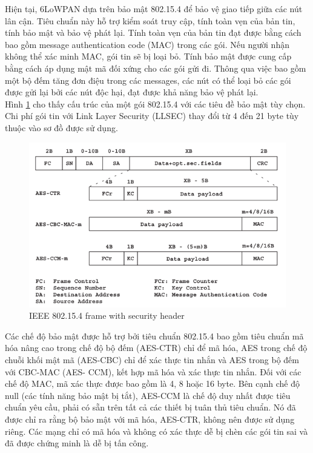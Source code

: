 \documentclass{report}
\begin{document}
Hiện tại, 6LoWPAN dựa trên bảo mật 802.15.4 để bảo vệ giao tiếp giữa các nút lân cận. Tiêu chuẩn này hỗ trợ kiểm soát truy cập, tính toàn vẹn của bản tin, tính bảo mật và bảo vệ phát lại. Tính toàn vẹn của bản tin đạt được bằng cách bao gồm message authentication code (MAC) trong các gói. Nếu người nhận không thể xác minh MAC, gói tin sẽ bị loại bỏ. Tính bảo mật được cung cấp bằng cách áp dụng mật mã đối xứng cho các gói gửi đi. Thông qua việc bao gồm một bộ đếm tăng đơn điệu trong các messages, các nút có thể loại bỏ các gói được gửi lại bởi các nút độc hại, đạt được khả năng bảo vệ phát lại. \\

Hình \ref{fig:Graph52} cho thấy cấu trúc của một gói 802.15.4 với các tiêu đề bảo mật tùy chọn. Chi phí gói tin với Link Layer Security (LLSEC) thay đổi từ 4 đến 21 byte tùy thuộc vào sơ đồ được sử dụng.
\begin{figure}[h]
	\centering
	\includegraphics[scale = 0.7]{fig52.png}
	\caption{IEEE 802.15.4 frame with security header}
	\label{fig:Graph52}
\end{figure}

Các chế độ bảo mật được hỗ trợ bởi tiêu chuẩn 802.15.4 bao gồm tiêu chuẩn mã hóa nâng cao trong chế độ bộ đếm (AES-CTR) chỉ để mã hóa, AES trong chế độ chuỗi khối mật mã (AES-CBC) chỉ để xác thực tin nhắn và AES trong bộ đếm với CBC-MAC (AES- CCM), kết hợp mã hóa và xác thực tin nhắn. Đối với các chế độ MAC, mã xác thực được bao gồm là 4, 8 hoặc 16 byte. Bên cạnh chế độ null (các tính năng bảo mật bị tắt), AES-CCM là chế độ duy nhất được tiêu chuẩn yêu cầu, phải có sẵn trên tất cả các thiết bị tuân thủ tiêu chuẩn. Nó đã được chỉ ra rằng bộ bảo mật với mã hóa, AES-CTR, không nên được sử dụng riêng. Các mạng chỉ có mã hóa và không có xác thực dễ bị chèn các gói tin sai và đã được chứng minh là dễ bị tấn công. \\
\end{document}
